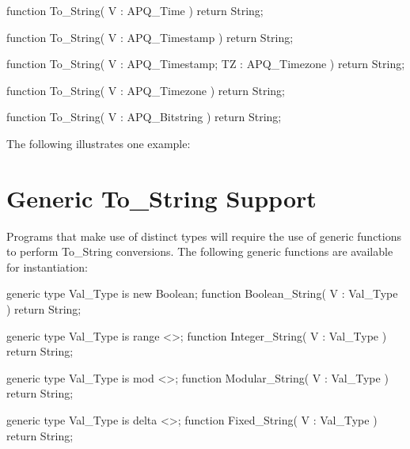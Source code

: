 \documentclass[english,letterpaper]{book}
\begin{document}
\begin{Code}
function To_String(
   V : APQ_Time
) return String;
\end{Code}

\begin{Code}
function To_String(
   V : APQ_Timestamp
) return String;
\end{Code}

\begin{Code}
function To_String(
   V :  APQ_Timestamp;
   TZ : APQ_Timezone
) return String;
\end{Code}

\begin{Code}
function To_String(
   V : APQ_Timezone
) return String;
\end{Code}

\begin{Code}
function To_String(
   V : APQ_Bitstring
) return String;
\end{Code}

The following illustrates one example:

\begin{Example}
declare
   Ship_Date : APQ_Date;
begin
   Put({
   Put_Line(To_String(Ship_Date));
\end{Example}

\section{Generic To\_String Support}

Programs that make use of distinct types will require the use of generic
functions to perform To\_String conversions. The following generic
functions are available for instantiation:

\begin{Code}
generic
   type Val_Type is new Boolean;
function Boolean_String(
   V : Val_Type
) return String;
\end{Code}

\begin{Code}
generic
   type Val_Type is range <>;
function Integer_String(
   V : Val_Type
) return String;
\end{Code}

\begin{Code}
generic
   type Val_Type is mod <>;
function Modular_String(
   V : Val_Type
) return String;
\end{Code}

\begin{Code}
generic
   type Val_Type is delta <>;
function Fixed_String(
   V : Val_Type
) return String;
\end{Code}
\end{document}
